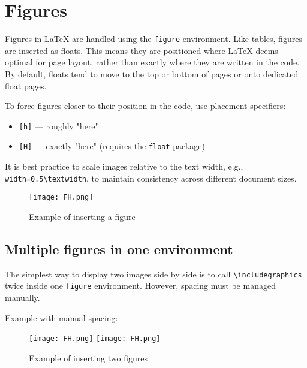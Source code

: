 \section{Figures}
    \label{sec:Figures}

    Figures in \LaTeX{} are handled using the \texttt{figure} environment.
    Like tables, figures are inserted as floats.
    This means they are positioned where \LaTeX{} deems optimal for page layout,
    rather than exactly where they are written in the code. By default,
    floats tend to move to the top or bottom of pages or onto dedicated float pages.

    To force figures closer to their position in the code, use placement specifiers:
    \begin{itemize}
        \item \texttt{[h]} — roughly "here"
        \item \texttt{[H]} — exactly "here" (requires the \texttt{float} package)
    \end{itemize}

    It is best practice to scale images relative to the text width, e.g.,\\
    \verb|width=0.5\textwidth|, to maintain consistency across different document sizes.

    \begin{figure}[h]
    	\centering
    	\texttt{[image: FH.png]}
    	\caption{Example of inserting a figure}
    	\label{fig:ExampleFigure-1}
    \end{figure}

\subsection{Multiple figures in one environment}

    The simplest way to display two images side by side is to call \verb|\includegraphics|
    twice inside one \texttt{figure} environment. However, spacing must be managed manually.

    Example with manual spacing:

    \begin{figure}[H]
        \centering
        \texttt{[image: FH.png]}
        \hfil
        \texttt{[image: FH.png]}
        \caption{Example of inserting two figures}
        \label{fig:ExampleFigure-2}
    \end{figure}

